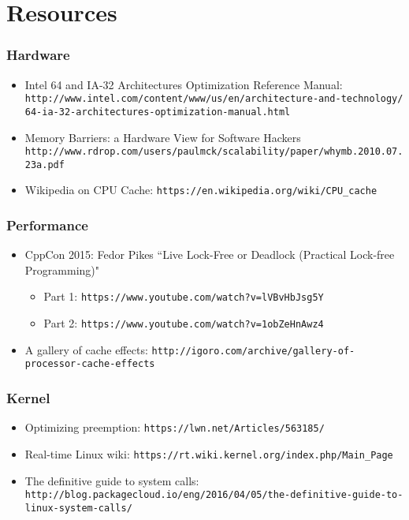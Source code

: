 \section{Resources}
\label{sec:res}

\begin{frame}[fragile]
  \frametitle{Hardware}

  \begin{itemize}
  \item Intel 64 and IA-32 Architectures Optimization Reference Manual: \tiny\verb+http://www.intel.com/content/www/us/en/architecture-and-technology/+
    \tiny\verb+64-ia-32-architectures-optimization-manual.html+
  \item \small Memory Barriers: a Hardware View for Software Hackers
    \tiny\verb+http://www.rdrop.com/users/paulmck/scalability/paper/whymb.2010.07.23a.pdf+
  \item \small Wikipedia on CPU Cache: \verb+https://en.wikipedia.org/wiki/CPU_cache+
  \end{itemize}
\end{frame}

\begin{frame}[fragile]
  \frametitle{Performance}

  \begin{itemize}
  \item CppCon 2015: Fedor Pikes “Live Lock-Free or Deadlock (Practical Lock-free Programming)"
    \begin{itemize}
    \item Part 1: \verb+https://www.youtube.com/watch?v=lVBvHbJsg5Y+
    \item Part 2: \verb+https://www.youtube.com/watch?v=1obZeHnAwz4+
    \end{itemize}
  \item A gallery of cache effects: \footnotesize\verb+http://igoro.com/archive/gallery-of-processor-cache-effects+
  \end{itemize}
\end{frame}

\begin{frame}[fragile]
  \frametitle{Kernel}

  \begin{itemize}
  \item Optimizing preemption: \verb+https://lwn.net/Articles/563185/+
  \item Real-time Linux wiki: \verb+https://rt.wiki.kernel.org/index.php/Main_Page+
    \item The definitive guide to system calls: \tiny\verb+http://blog.packagecloud.io/eng/2016/04/05/the-definitive-guide-to-linux-system-calls/+
  \end{itemize}
\end{frame}
